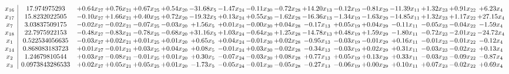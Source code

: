 \documentclass[9pt]{article}
\begin{document}
 \[\begin{array}{c| c c@{\hskip 2pt} c@{\hskip 2pt} c@{\hskip 2pt} c@{\hskip 2pt} c@{\hskip 2pt} c@{\hskip 2pt} c@{\hskip 2pt} c@{\hskip 2pt} c@{\hskip 2pt} c@{\hskip 2pt} c@{\hskip 2pt} c@{\hskip 2pt} c@{\hskip 2pt} c@{\hskip 2pt} c@{\hskip 2pt} }
 x_{16}   &  17.974975293 & +  0.64 x_{27} & +  0.76 x_{21} & +  0.67 x_{25} & +  0.54 x_{20} & -31.68 x_{5} & -1.47 x_{24} & -0.11 x_{30} & -0.72 x_{28} & + 14.20 x_{13} & -0.12 x_{19} & -0.81 x_{29} & -11.39 x_{11} & +  1.32 x_{23} & +  0.91 x_{22} & +  6.23 x_{4}\\
 x_{17}   &  15.8232022505 & -0.10 x_{27} & +  1.66 x_{21} & +  0.40 x_{25} & +  0.72 x_{20} & -19.32 x_{5} & +  0.13 x_{24} & +  0.55 x_{30} & -1.62 x_{28} & -16.36 x_{13} & -1.34 x_{19} & -1.63 x_{29} & -14.85 x_{11} & +  1.32 x_{23} & +  1.17 x_{22} & + 27.15 x_{4}\\
 x_{7}   &  3.03837509175 & -0.02 x_{27} & -0.02 x_{21} & -0.07 x_{25} & -0.03 x_{20} & +  1.56 x_{5} & +  0.01 x_{24} & -0.00 x_{30} & +  0.04 x_{28} & -0.17 x_{13} & +  0.05 x_{19} & +  0.04 x_{29} & -0.11 x_{11} & -0.05 x_{23} & -0.04 x_{22} & -1.59 x_{4}\\
 x_{18}   &  22.7975922153 & -0.48 x_{27} & -0.83 x_{21} & -0.78 x_{25} & -0.68 x_{20} & + 31.16 x_{5} & +  1.03 x_{24} & -0.64 x_{30} & +  1.25 x_{28} & -14.78 x_{13} & +  0.48 x_{19} & +  1.59 x_{29} & -1.80 x_{11} & -0.72 x_{23} & -2.01 x_{22} & -24.72 x_{4}\\
 x_{1}   &  0.522534056635 & -0.03 x_{27} & +  0.02 x_{21} & +  0.01 x_{25} & +  0.01 x_{20} & +  0.65 x_{5} & +  0.04 x_{24} & -0.01 x_{30} & +  0.02 x_{28} & -0.95 x_{13} & -0.03 x_{19} & -0.01 x_{29} & +  0.16 x_{11} & -0.01 x_{23} & -0.01 x_{22} & -0.12 x_{4}\\
 x_{14}   &  0.868083183723 & +  0.01 x_{27} & -0.01 x_{21} & +  0.03 x_{25} & +  0.04 x_{20} & +  0.08 x_{5} & -0.01 x_{24} & +  0.03 x_{30} & -0.02 x_{28} & -0.34 x_{13} & -0.03 x_{19} & +  0.02 x_{29} & +  0.31 x_{11} & -0.03 x_{23} & -0.02 x_{22} & +  0.13 x_{4}\\
 x_{2}   &  1.24679810544 & +  0.03 x_{27} & -0.08 x_{21} & -0.01 x_{25} & +  0.01 x_{20} & +  0.30 x_{5} & -0.07 x_{24} & -0.03 x_{30} & +  0.08 x_{28} & +  0.77 x_{13} & +  0.05 x_{19} & +  0.13 x_{29} & +  0.33 x_{11} & -0.03 x_{23} & -0.09 x_{22} & -0.87 x_{4}\\
 x_{3}   &  0.0973843286533 & +  0.02 x_{27} & +  0.05 x_{21} & +  0.05 x_{25} & +  0.01 x_{20} & -1.73 x_{5} & -0.05 x_{24} & -0.01 x_{30} & -0.05 x_{28} & -0.27 x_{13} & -0.06 x_{19} & +  0.00 x_{29} & +  0.10 x_{11} & +  0.07 x_{23} & -0.02 x_{22} & +  0.69 x_{4}\\

\end{array}\]
\end{document}
